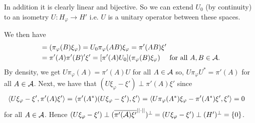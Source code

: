 \documentclass[10pt,english,a4paper]{article}
\theoremstyle{definition}
\def\pivp{\pi_{\vphi}}
\def\Hvp{H_{\vphi}}
\def\xivp{\xi_{\vphi}}
\def\vphi{\varphi}
\begin{document}
In addition it is clearly linear and bijective. So we can extend $U_0$
(by continuity) to an isometry $U \colon \Hvp \to H'$ i.e. $U$ is a unitary operator 
between these spaces. 

We then have 
\begin{align*}
[U\pivp(A)] &= (\pivp(B)\xivp) = U_0\pivp(AB)\xivp = \pi'(AB)\xi' \\ &=
\pi'(A)\pi'(B)'\xi' = [\pi'(A)U_0](\pivp(B)\xivp) \quad \text{ for all }A,B\in
\As.
\end{align*}
By density, we get $U\pivp(A) = \pi'(A)U$ for all $A \in \mathcal{A}$ so, $U\pivp U^* =
\pi'(A)$ for all $A\in \mathcal{A}$.
Next, we have that $(U\xivp -\xi')\perp \pi'(A)\xi'$
since 
\begin{align*}
\ind{U\xivp-\xi', \pi'(A)\xi'} &= \ind{\pi'(A^*)(U\xivp - \xi'), \xi'} = 
\ind{U\pivp(A^*)\xivp - \pi'(A^*)\xi', \xi'} = 0
\end{align*}
for all $A \in \mathcal{A}$. Hence $(U\xivp - \xi') \perp(\ol{\pi'(\As)\xi'}^{||\cdot||})^{\perp} = 
(U\xivp - \xi') \perp (H')^{\perp} = \{0\}$. 
\end{document}
